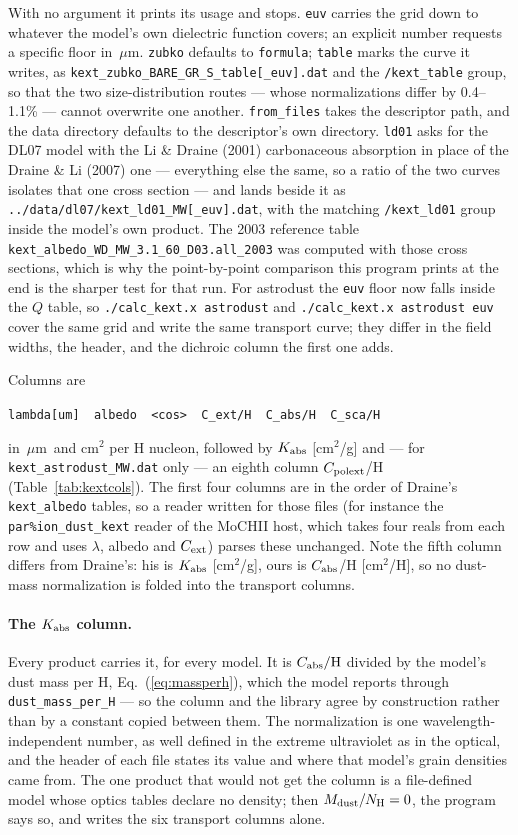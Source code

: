 \documentclass{my_memo}
\newcommand{\code}[1]{\texttt{#1}}
\newcommand{\um}{\ensuremath{\,\mu\mathrm{m}}}
\begin{document}
\noindent With no argument it prints its usage and stops. \code{euv} carries the
grid down to whatever the model's own dielectric function covers; an explicit
number requests a specific floor in \um. \code{zubko} defaults to
\code{formula}; \code{table} marks the curve it writes, as
\code{kext\_zubko\_BARE\_GR\_S\_table[\_euv].dat} and the \code{/kext\_table}
group, so that the two size-distribution routes --- whose normalizations differ
by 0.4--1.1\% --- cannot overwrite one another. \code{from\_files} takes the descriptor path, and the data
directory defaults to the descriptor's own directory. \code{ld01} asks for the
DL07 model with the Li \& Draine (2001) carbonaceous absorption in place of the
Draine \& Li (2007) one --- everything else the same, so a ratio of the two
curves isolates that one cross section --- and lands beside it as
\code{../data/dl07/kext\_ld01\_MW[\_euv].dat}, with the matching
\code{/kext\_ld01} group inside the model's own product. The 2003 reference
table \code{kext\_albedo\_WD\_MW\_3.1\_60\_D03.all\_2003} was computed
with those cross sections, which is why the point-by-point comparison this
program prints at the end is the sharper test for that run. For astrodust the
\code{euv} floor now falls inside the $Q$ table, so
\code{./calc\_kext.x astrodust} and \code{./calc\_kext.x astrodust euv} cover
the same grid and write the same transport curve; they differ in the field
widths, the header, and the dichroic column the first one adds.

Columns are
\begin{center}
\code{lambda[um] \ albedo \ <cos> \ C\_ext/H \ C\_abs/H \ C\_sca/H}
\end{center}
in \um\ and cm$^2$ per H nucleon, followed by $K_{\rm abs}$ [cm$^2$/g] and ---
for \code{kext\_astrodust\_MW.dat} only --- an eighth column $C_{\rm polext}$/H
(Table~\ref{tab:kextcols}). The first four columns are in the order of Draine's
\code{kext\_albedo} tables, so a reader written for those files (for instance
the \code{par\%ion\_dust\_kext} reader of the MoCHII host, which takes four
reals from each row and uses $\lambda$, albedo and $C_{\rm ext}$) parses these
unchanged. Note the fifth column differs from Draine's: his is $K_{\rm abs}$
[cm$^2$/g], ours is $C_{\rm abs}$/H [cm$^2$/H], so no dust-mass normalization
is folded into the transport columns.

\paragraph{The $K_{\rm abs}$ column.} Every product carries it, for every model.
It is $C_{\rm abs}/{\rm H}$ divided by the model's dust mass per H,
Eq.~(\ref{eq:massperh}), which the model reports through
\code{dust\_mass\_per\_H} --- so the column and the library agree by
construction rather than by a constant copied between them. The normalization is
one wavelength-independent number, as well defined in the extreme ultraviolet as
in the optical, and the header of each file states its value and where that
model's grain densities came from. The one product that would not get the column
is a file-defined model whose optics tables declare no density; then
$M_{\rm dust}/N_{\rm H} = 0$, the program says so, and writes the six transport
columns alone.
\end{document}
